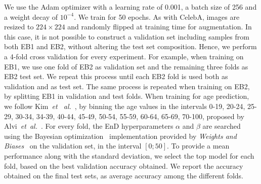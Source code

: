 We use the Adam optimizer with a learning rate of 0.001, a batch size of 256 and a weight decay of $10^{-4}$. We train for 50 epochs. As with CelebA, images are resized to $224\times224$ and randomly flipped at training time for augmentation. In this case, it is not possible to construct a validation set including samples from both EB1 and EB2, without altering the test set composition. Hence, we perform a 4-fold cross validation for every experiment. For example, when training on EB1, we use one fold of EB2 as validation set and the remaining three folds as EB2 test set. We repeat this process until each EB2 fold is used both as validation and as test set. The same process is repeated when training on EB2, by splitting EB1 in validation and test folds. When training for age prediction, we follow Kim~\emph{et ~al.}~\cite{Kim_2019_CVPR}, by binning the age values in the intervals 0-19, 20-24, 25-29, 30-34, 34-39, 40-44, 45-49, 50-54, 55-59, 60-64, 65-69, 70-100, proposed by Alvi~\emph{et~al.}~\cite{alvi2018turning}.
For every fold, the EnD hyperparameters $\alpha$ and $\beta$ are searched using the Bayesian optimization~\cite{snoek2012practical} implementation provided by \emph{Weights and Biases}~\cite{wandb} on the validation set, in the interval $[0;50]$.
To provide a mean performance along with the standard deviation, we select the top model for each fold, based on the best validation accuracy obtained. We report the accuracy obtained on the final test sets, as average accuracy among the different folds. 